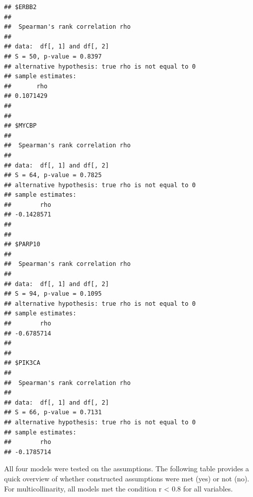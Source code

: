 \documentclass[]{article}
\begin{document}
\begin{verbatim}
## $ERBB2
## 
##  Spearman's rank correlation rho
## 
## data:  df[, 1] and df[, 2]
## S = 50, p-value = 0.8397
## alternative hypothesis: true rho is not equal to 0
## sample estimates:
##       rho 
## 0.1071429 
## 
## 
## $MYCBP
## 
##  Spearman's rank correlation rho
## 
## data:  df[, 1] and df[, 2]
## S = 64, p-value = 0.7825
## alternative hypothesis: true rho is not equal to 0
## sample estimates:
##        rho 
## -0.1428571 
## 
## 
## $PARP10
## 
##  Spearman's rank correlation rho
## 
## data:  df[, 1] and df[, 2]
## S = 94, p-value = 0.1095
## alternative hypothesis: true rho is not equal to 0
## sample estimates:
##        rho 
## -0.6785714 
## 
## 
## $PIK3CA
## 
##  Spearman's rank correlation rho
## 
## data:  df[, 1] and df[, 2]
## S = 66, p-value = 0.7131
## alternative hypothesis: true rho is not equal to 0
## sample estimates:
##        rho 
## -0.1785714
\end{verbatim}

All four models were tested on the assumptions. The following table
provides a quick overview of whether constructed assumptions were met
(yes) or not (no). For multicollinarity, all models met the condition r
\textless{} 0.8 for all variables.
\end{document}
